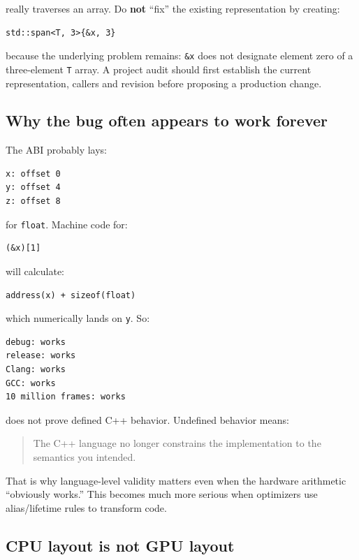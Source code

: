 really traverses an array. Do \textbf{not} ``fix'' the existing representation by creating:

\begin{verbatim}
std::span<T, 3>{&x, 3}
\end{verbatim}

because the underlying problem remains: \texttt{\&x} does not designate element zero of a three-element \texttt{T} array. A project audit should first establish the current representation, callers and revision before proposing a production change.

\subsection{Why the bug often appears to work forever}\label{05-engine-i-ch003-why-the-bug-often-appears-to-work-forever}

The ABI probably lays:

\begin{verbatim}
x: offset 0
y: offset 4
z: offset 8
\end{verbatim}

for \texttt{float}. Machine code for:

\begin{verbatim}
(&x)[1]
\end{verbatim}

will calculate:

\begin{verbatim}
address(x) + sizeof(float)
\end{verbatim}

which numerically lands on \texttt{y}. So:

\begin{verbatim}
debug: works
release: works
Clang: works
GCC: works
10 million frames: works
\end{verbatim}

does not prove defined C++ behavior. Undefined behavior means:

\begin{quote}
The C++ language no longer constrains the implementation to the semantics you intended.
\end{quote}

That is why language-level validity matters even when the hardware arithmetic ``obviously works.'' This becomes much more serious when optimizers use alias/lifetime rules to transform code.

\subsection{CPU layout is not GPU layout}\label{05-engine-i-ch003-cpu-layout-is-not-gpu-layout}

